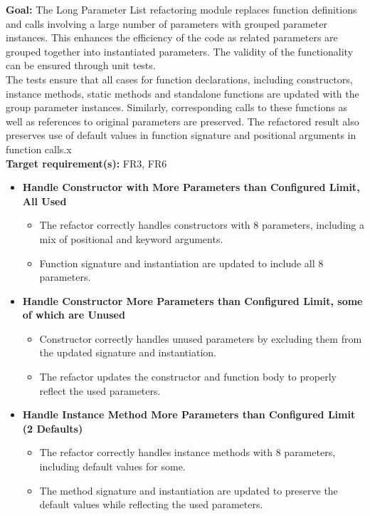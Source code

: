 \documentclass[12pt, titlepage]{article}
\begin{document}
\begin{enumerate}[label={\bf \textcolor{Maroon}{test-SRT-\arabic*}}, wide=0pt, font=\itshape]
\textbf{Goal:} The Long Parameter List refactoring module replaces function definitions and calls involving a large number of parameters with grouped parameter instances. This enhances the efficiency of the code as related parameters are grouped together into instantiated parameters. The validity of the functionality can be ensured through unit tests.\\

\noindent The tests ensure that all cases for function declarations, including constructors, instance methods, static methods and standalone functions are updated with the group parameter instances. Similarly, corresponding calls to these functions as well as references to original parameters are preserved. The refactored result also preserves use of default values in function signature and positional arguments in function calls.x\\

\noindent \textbf{Target requirement(s):} FR3, FR6~\cite{SRS} \\

\begin{itemize}
    \item \textbf{Handle Constructor with More Parameters than Configured Limit, All Used}
    \begin{itemize}
        \item The refactor correctly handles constructors with 8 parameters, including a mix of positional and keyword arguments.
        \item Function signature and instantiation are updated to include all 8 parameters.
    \end{itemize}

    \item \textbf{Handle Constructor More Parameters than Configured Limit, some of which are Unused}
    \begin{itemize}
        \item Constructor correctly handles unused parameters by excluding them from the updated signature and instantiation.
        \item The refactor updates the constructor and function body to properly reflect the used parameters.
    \end{itemize}

    \item \textbf{Handle Instance Method More Parameters than Configured Limit (2 Defaults)}
    \begin{itemize}
        \item The refactor correctly handles instance methods with 8 parameters, including default values for some.
        \item The method signature and instantiation are updated to preserve the default values while reflecting the used parameters.
    \end{itemize}


\end{itemize}
\end{enumerate}
\end{document}

